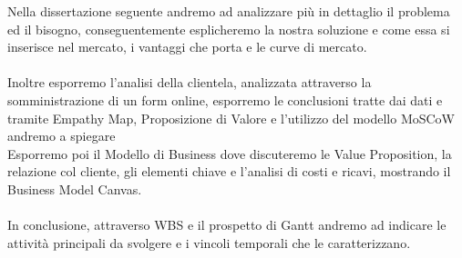 \documentclass[a4paper, 12pt]{article}
\begin{document}
	Nella dissertazione seguente andremo ad analizzare più in dettaglio il problema ed il bisogno, conseguentemente esplicheremo la nostra soluzione e come essa si inserisce nel mercato, i vantaggi che porta e le curve di mercato.\\\\
	Inoltre esporremo l'analisi della clientela, analizzata attraverso la somministrazione di un form online, %
	esporremo le conclusioni tratte dai dati e tramite Empathy Map, Proposizione di Valore e l'utilizzo del modello MoSCoW andremo a spiegare\\ %
	Esporremo poi il Modello di Business dove discuteremo le Value Proposition, la relazione col cliente, gli elementi chiave e l'analisi di costi e ricavi, mostrando il Business Model Canvas.\\\\
	In conclusione, attraverso WBS e il prospetto di Gantt andremo ad indicare le attività principali da svolgere e i vincoli temporali che le caratterizzano.
	\newpage
\end{document}

